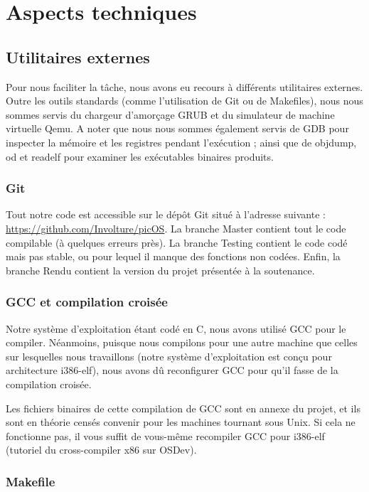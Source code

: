 \documentclass[a4paper, 11pt, twoside]{article}
\begin{document}
\section{Aspects techniques}

\subsection{Utilitaires externes}

Pour nous faciliter la tâche, nous avons eu recours à différents utilitaires
externes. Outre les outils standards (comme l'utilisation de Git ou de
Makefiles), nous nous sommes servis du chargeur d'amorçage GRUB et du simulateur
de machine virtuelle Qemu. A noter que nous nous sommes également servis de GDB pour inspecter la mémoire et les registres pendant l'exécution ; ainsi que de objdump, od et readelf pour examiner les exécutables binaires produits.

\subsubsection{Git}

Tout notre code est accessible sur le dépôt Git situé à l'adresse suivante :
\url{https://github.com/Involture/picOS}. La branche Master contient tout le
code compilable (à quelques erreurs près). La branche Testing contient le code
codé mais pas stable, ou pour lequel il manque des fonctions non codées. Enfin,
la branche Rendu contient la version du projet présentée à la soutenance.

\subsubsection{GCC et compilation croisée}

Notre système d'exploitation étant codé en C, nous avons utilisé GCC pour le
compiler. Néanmoins, puisque nous compilons pour une autre machine que celles
sur lesquelles nous travaillons (notre système d'exploitation est conçu pour
architecture i386-elf), nous avons dû reconfigurer GCC pour qu'il fasse de la
compilation croisée.

Les fichiers binaires de cette compilation de GCC sont en annexe du projet, et
ils sont en théorie censés convenir pour les machines tournant sous Unix. Si
cela ne fonctionne pas, il vous suffit de vous-même recompiler GCC pour
i386-elf (tutoriel du cross-compiler x86 sur OSDev).

\subsubsection{Makefile}
\end{document}
